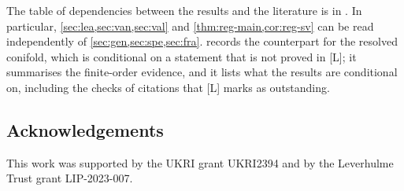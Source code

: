 The table of dependencies between the results and the literature is in . In particular, \cref{sec:lea,sec:van,sec:val} and \cref{thm:reg-main,cor:reg-sv} can be read independently of \cref{sec:gen,sec:spe,sec:fra}.  records the counterpart for the resolved conifold, which is conditional on a statement that is not proved in \textup{[L]}; it summarises the finite-order evidence, and it lists what the results are conditional on, including the checks of citations that \textup{[L]} marks as outstanding.

\subsection*{Acknowledgements}

This work was supported by the UKRI grant UKRI2394 and by the Leverhulme Trust grant LIP-2023-007.
